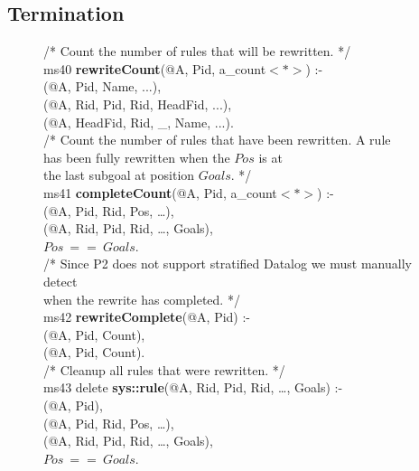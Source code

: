 \subsection{Termination}

\begin{figure}[!t]
\ssp
\centering
\begin{boxedminipage}{\linewidth}
/* Count the number of rules that will be rewritten. */ \\
ms40 {\bf rewriteCount}(@A, Pid, a\_count$<*>$) :- \\
(@A, Pid, Name, ...), \\
(@A, Rid, Pid, Rid, HeadFid, ...), \\
(@A, HeadFid, Rid, \_, Name, ...). \\
	
/* Count the number of rules that have been rewritten. A rule \\
has been fully rewritten when the  $Pos$ is at \\
the last subgoal at position $Goals$. */ \\
ms41 {\bf completeCount}(@A, Pid, a\_count$<*>$) :- \\
(@A, Pid, Rid, Pos, \ldots), \\
(@A, Rid, Pid, Rid, \ldots, Goals), \\
\datalogspace $Pos\ ==\ Goals$. \\
	
/* Since P2 does not support stratified Datalog we must manually detect  \\
when the rewrite has completed. */ \\
ms42 {\bf rewriteComplete}(@A, Pid) :-  \\
(@A, Pid, Count), \\
(@A, Pid, Count). \\

/* Cleanup all rules that were rewritten. */ \\
ms43 delete {\bf sys::rule}(@A, Rid, Pid, Rid, \ldots, Goals) :- \\
(@A, Pid), \\
(@A, Pid, Rid, Pos, \ldots), \\
(@A, Rid, Pid, Rid, \ldots, Goals), \\
\datalogspace $Pos\ ==\ Goals$. \\


\end{boxedminipage}
\end{figure}
